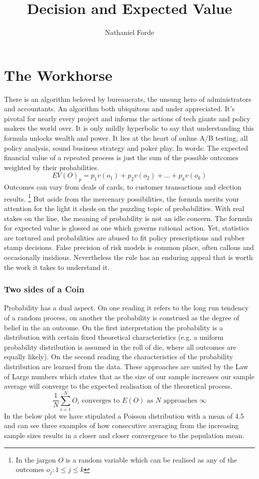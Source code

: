 \documentclass[10pt,a4paper,notitlepage, twocolumn]{article}
\author{Nathaniel Forde}
\title{Decision and Expected Value}
\begin{document}
\section*{The Workhorse}
There is an algorithm beloved by bureaucrats, the unsung hero of administrators and accountants. An algorithm  both ubiquitous and under appreciated. It's pivotal for nearly every project and informs the actions of tech giants and policy makers the world over. It is only mildly hyperbolic to say that understanding this formula unlocks wealth and power. It lies at the heart of online A/B testing, all policy analysis, sound business strategy and poker play. In words: The expected financial value of a repeated process is just the sum of the possible outcomes weighted by their probabilities. 
$$ EV(O)_{p} = p_{1}v(o_{1}) + p_{2}v(o_{2}) + ... + p_{k}v(o_{k}) $$
Outcomes can vary from deals of cards, to customer transactions and election results. \footnote{In the jargon $O$ is a random variable which can be realised as any of the outcomes  $ o_{j} :  1 \leq j \leq k$} But aside from the mercenary possibilities, the formula merits your attention for the light it sheds on the puzzling topic of probabilities. With real stakes on the line, the meaning of probability is not an idle concern. The formula for expected value is glossed as one which governs rational action. Yet, statistics are tortured and probabilities are abused to fit policy prescriptions and rubber stamp decisions. False precision of risk models is common place, often callous and occasionally insidious. Nevertheless the rule has an enduring appeal that is worth the work it takes to understand it. 

\subsubsection*{Two sides of a Coin}
Probability has a dual aspect. On one reading it refers to the long run tendency of a random process, on another the probability is construed as the degree of belief in the an outcome. On the first interpretation the probability is a distribution with certain fixed theoretical characteristics (e.g. a uniform probability distribution is assumed in the roll of die, where all outcomes are equally likely). On the second reading the characteristics of the probability distribution are learned from the data. These approaches are united by the Law of Large numbers which states that as the size of our sample increases our sample average will converge to the expected realisation of the theoretical process.
$$  \frac{1}{N} \sum_{i = 1}^{N} O_{i} \text{ converges to }  E(O) \text{ as } N \text{ approaches } \infty $$ 
In the below plot we have stipulated a Poisson distribution with a mean of 4.5 and can see three examples of how consecutive averaging from the increasing sample sizes results in a closer and closer convergence to the population mean.
\end{document}

